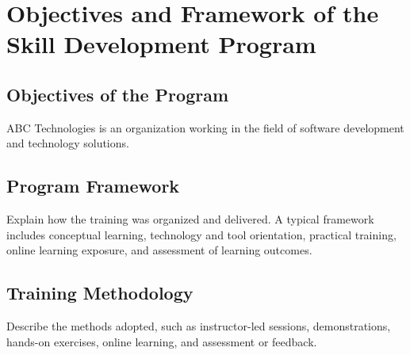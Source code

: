 \chapter{Objectives and Framework of the Skill Development Program}

\section{Objectives of the Program}

ABC Technologies is an organization working in the field
of software development and technology solutions.



\section{Program Framework}

Explain how the training was organized and delivered. A typical framework includes conceptual learning, technology and tool orientation, practical training, online learning exposure, and assessment of learning outcomes.


\section{Training Methodology}
Describe the methods adopted, such as instructor-led sessions, demonstrations, hands-on exercises, online learning, and assessment or feedback.